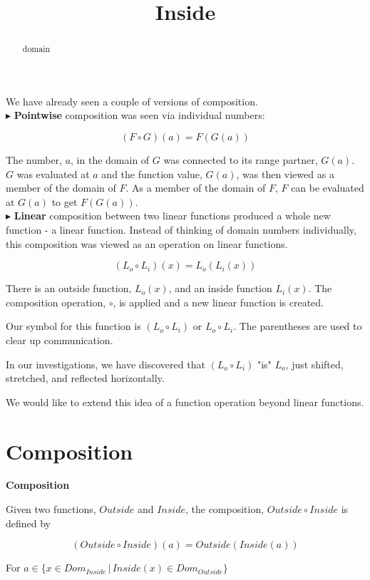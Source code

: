 \documentclass{ximera}
\title{Inside}
\begin{document}
\begin{abstract}
domain
\end{abstract}
\maketitle



We have already seen a couple of versions of composition. \\

$\blacktriangleright$ \textbf{Pointwise} composition was seen via individual numbers: 

\[ (F \circ G)(a) = F(G(a)) \]

The number, $a$, in the domain of $G$ was connected to its range partner, $G(a)$.  $G$ was evaluated at $a$ and the function value, $G(a)$, was then viewed as a member of the domain of $F$.  As a member of the domain of $F$, $F$ can be evaluated at $G(a)$ to get $F(G(a))$. \\




$\blacktriangleright$ \textbf{Linear} composition between two linear functions produced a whole new function - a linear function.  Instead of thinking of domain numbers individually, this composition was viewed as an operation on linear functions.

\[    (L_o \circ L_i)(x) = L_o(L_i(x))  \]

There is an outside function, $L_o(x)$, and an inside function $L_i(x)$.  The composition operation, $\circ$, is applied and a new linear function is created.  



Our symbol for this function is $(L_o \circ L_i)$ or $L_o \circ L_i$.  The parentheses are used to clear up communication.

In our investigations, we have discovered that $(L_o \circ L_i)$ "is" $L_o$, just shifted, stretched, and reflected horizontally.


We would like to extend this idea of a function operation beyond linear functions.





\section{Composition}





\begin{definition} \textbf{\textcolor{green!50!black}{Composition}}  


Given two functions, $Outside$ and $Inside$, the composition, $Outside \circ Inside$ is defined by

\[      (Outside \circ Inside)(a) = Outside(Inside(a))        \]

For $ a \in \{  x \in Dom_{Inside} \, | \,    Inside(x) \in Dom_{Outside}  \}$

\end{definition}
\end{document}
